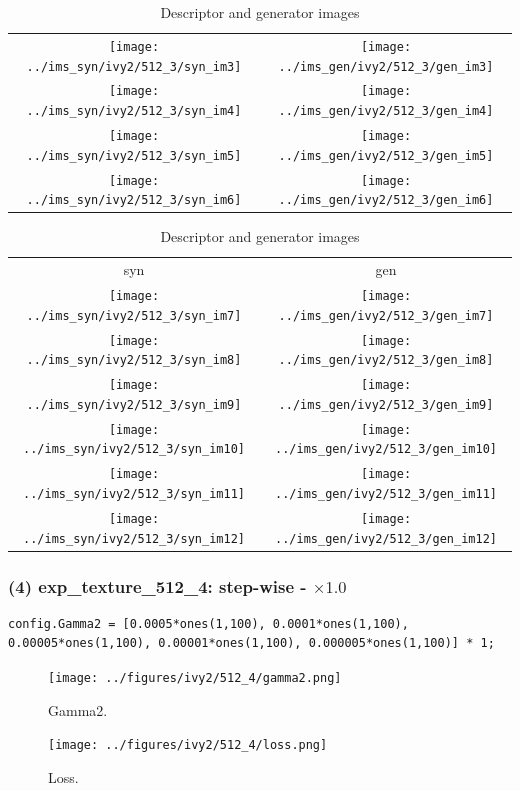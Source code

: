 \documentclass[letter]{article}
\begin{document}
\begin{table}[h!]
\begin{tabular}{cc}
		\texttt{[image: ../ims\_syn/ivy2/512\_3/syn\_im3]} & \texttt{[image: ../ims\_gen/ivy2/512\_3/gen\_im3]} \tabularnewline
		\texttt{[image: ../ims\_syn/ivy2/512\_3/syn\_im4]} & \texttt{[image: ../ims\_gen/ivy2/512\_3/gen\_im4]} \tabularnewline
		\texttt{[image: ../ims\_syn/ivy2/512\_3/syn\_im5]} & \texttt{[image: ../ims\_gen/ivy2/512\_3/gen\_im5]} \tabularnewline
		\texttt{[image: ../ims\_syn/ivy2/512\_3/syn\_im6]} & \texttt{[image: ../ims\_gen/ivy2/512\_3/gen\_im6]} \tabularnewline
	\end{tabular}
	\begin{tabular}{cc}
		syn & gen\tabularnewline
		\texttt{[image: ../ims\_syn/ivy2/512\_3/syn\_im7]} & \texttt{[image: ../ims\_gen/ivy2/512\_3/gen\_im7]} \tabularnewline
		\texttt{[image: ../ims\_syn/ivy2/512\_3/syn\_im8]} & \texttt{[image: ../ims\_gen/ivy2/512\_3/gen\_im8]} \tabularnewline
		\texttt{[image: ../ims\_syn/ivy2/512\_3/syn\_im9]} & \texttt{[image: ../ims\_gen/ivy2/512\_3/gen\_im9]} \tabularnewline
		\texttt{[image: ../ims\_syn/ivy2/512\_3/syn\_im10]} & \texttt{[image: ../ims\_gen/ivy2/512\_3/gen\_im10]} \tabularnewline
		\texttt{[image: ../ims\_syn/ivy2/512\_3/syn\_im11]} & \texttt{[image: ../ims\_gen/ivy2/512\_3/gen\_im11]} \tabularnewline
		\texttt{[image: ../ims\_syn/ivy2/512\_3/syn\_im12]} & \texttt{[image: ../ims\_gen/ivy2/512\_3/gen\_im12]} \tabularnewline
	\end{tabular}
	\caption{Descriptor and generator images}
\end{table}

\newpage

\subsubsection*{(4) exp\_texture\_512\_4: step-wise - $\times1.0$}

\begin{lstlisting}
config.Gamma2 = [0.0005*ones(1,100), 0.0001*ones(1,100), 0.00005*ones(1,100), 0.00001*ones(1,100), 0.000005*ones(1,100)] * 1;
\end{lstlisting}

\begin{figure}[h!]
	\centering
	\texttt{[image: ../figures/ivy2/512\_4/gamma2.png]}
	\caption{\label{fig:gamma1}Gamma2.}
\end{figure}

\begin{figure}[h!]
	\centering
	\texttt{[image: ../figures/ivy2/512\_4/loss.png]}
	\caption{\label{fig:gamma1}Loss.}
\end{figure}
\end{document}
